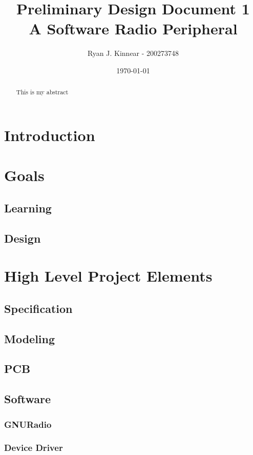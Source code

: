 \documentclass[a4paper, 12pt]{article}
\begin{document}
\author{Ryan J. Kinnear - 200273748}
\title{Preliminary Design Document 1 \\
  A Software Radio Peripheral}
\date{\today}
\maketitle

\begin{abstract}
This is my abstract
\end{abstract}

\newpage
\tableofcontents
\newpage
\listoffigures
\newpage

\section{Introduction}

\section{Goals}
\subsection{Learning}
\subsection{Design}

\section{High Level Project Elements}
\subsection{Specification}
\subsection{Modeling}
\subsection{PCB}
\subsection{Software}
\subsubsection{GNURadio}
\subsubsection{Device Driver}
\end{document}
